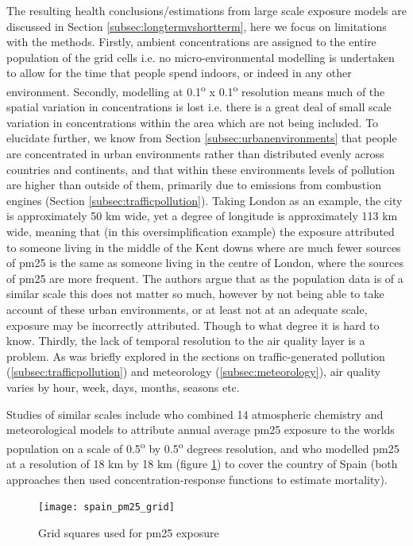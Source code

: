 The resulting health conclusions/estimations from large scale exposure models are discussed in Section \ref{subsec:longtermvshortterm}, here we focus on limitations with the methods. Firstly, ambient concentrations are assigned to the entire population of the grid cells i.e. no micro-environmental modelling is undertaken to allow for the time that people spend indoors, or indeed in any other environment. Secondly, modelling at 0.1\textsuperscript{o} x 0.1\textsuperscript{o} resolution means much of the spatial variation in concentrations is lost i.e. there is a great deal of small scale variation in concentrations within the area which are not being included. To elucidate further, we know from Section \ref{subsec:urbanenvironments} that people are concentrated in urban environments rather than distributed evenly across countries and continents, and that within these environments levels of pollution are higher than outside of them, primarily due to emissions from combustion engines (Section \ref{subsec:trafficpollution}). Taking London as an example, the city is approximately 50 km wide, yet a degree of longitude is approximately 113 km wide, meaning that (in this oversimplification example) the exposure attributed to someone living in the middle of the Kent downs where are much fewer sources of \gls{pm25} is the same as someone living in the centre of London, where the sources of \gls{pm25} are more frequent. The authors argue that as the population data is of a similar scale this does not matter so much, however by not being able to take account of these urban environments, or at least not at an adequate scale, exposure may be incorrectly attributed. Though to what degree it is hard to know. Thirdly, the lack of temporal resolution to the air quality layer is a problem. As was briefly explored in the sections on traffic-generated pollution (\ref{subsec:trafficpollution}) and meteorology (\ref{subsec:meteorology}), air quality varies by hour, week, days, months, seasons etc.

Studies of similar scales include \cite{Silva2013} who combined 14 atmospheric chemistry and meteorological models to attribute annual average \gls{pm25} exposure to the worlds population on a scale of 0.5\textsuperscript{o} by 0.5\textsuperscript{o} degrees resolution, and \cite{Boldo2011} who modelled \gls{pm25} at a resolution of 18 km by 18 km (figure \ref{fig:gspain_pm25_grid}) to cover the country of Spain (both approaches then used concentration-response functions to estimate mortality).

\begin{figure}[H]
\centering
\texttt{[image: spain\_pm25\_grid]}
\caption{Grid squares used for \gls{pm25} exposure}
\label{fig:gspain_pm25_grid}
\end{figure}

